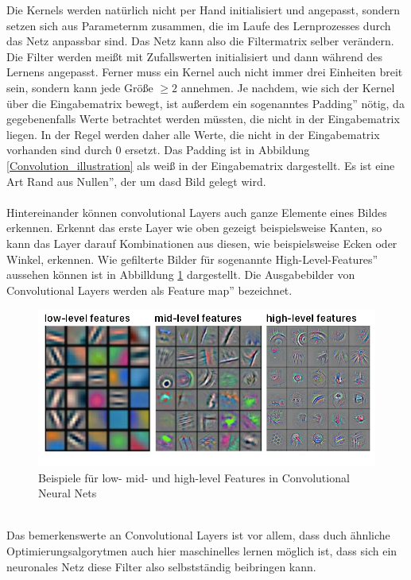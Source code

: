 \documentclass{article}
\begin{document}
Die Kernels werden natürlich nicht per Hand initialisiert und angepasst, sondern setzen sich aus Parameternm zusammen, die im Laufe des Lernprozesses durch das Netz anpassbar sind. Das Netz kann also die Filtermatrix selber verändern. Die Filter werden meißt mit Zufallswerten initialisiert und dann während des Lernens  angepasst. Ferner muss ein Kernel auch nicht immer drei Einheiten breit sein, sondern kann jede Größe $\ge2$ annehmen. Je nachdem, wie sich der Kernel über die Eingabematrix bewegt, ist außerdem ein sogenanntes \glqq Padding'' nötig, da gegebenenfalls Werte betrachtet werden müssten, die nicht in der Eingabematrix liegen. In der Regel werden daher alle Werte, die nicht in der Eingabematrix vorhanden sind durch 0 ersetzt. Das Padding ist in Abbildung \ref{Convolution_illustration} als weiß in der Eingabematrix dargestellt. Es ist eine Art \glqq Rand aus Nullen'', der um dasd Bild gelegt wird.\\ 
\\
Hintereinander können convolutional Layers auch ganze Elemente eines Bildes erkennen. Erkennt das erste Layer wie oben gezeigt beispielsweise Kanten, so kann das Layer darauf Kombinationen aus diesen, wie beispielsweise Ecken oder Winkel, erkennen. Wie gefilterte Bilder für sogenannte \glqq High-Level-Features'' aussehen können ist in Abbilldung \ref{HL_features_conv} dargestellt. Die Ausgabebilder von Convolutional Layers werden als \glqq Feature map'' bezeichnet.
\begin{figure}[h]
	\includegraphics[width=\linewidth]{../graphics/features.png}
	\caption[Beispiele für low- mid- und high-level Features in Convolutional Neural Nets\newline
	Quelle: https://tvirdi.github.io/2017-10-29/cnn/]{Beispiele für low- mid- und high-level Features in Convolutional Neural Nets}
	\label{HL_features_conv}
\end{figure}
\\
Das bemerkenswerte an Convolutional Layers ist vor allem, dass duch ähnliche Optimierungsalgorytmen auch hier maschinelles lernen möglich ist, dass sich ein neuronales Netz diese Filter also selbstständig beibringen kann.
\end{document}
